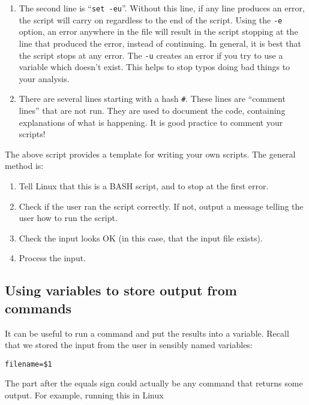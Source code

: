 \documentclass[11pt]{article}
\providecommand{\tightlist}{%
      \setlength{\itemsep}{0pt}\setlength{\parskip}{0pt}}
\begin{document}
\begin{enumerate}
\def\labelenumi{\arabic{enumi}.}
\tightlist
\item
  The second line is ``\texttt{set\ -eu}''. Without this line, if any
  line produces an error, the script will carry on regardless to the end
  of the script. Using the \texttt{-e} option, an error anywhere in the
  file will result in the script stopping at the line that produced the
  error, instead of continuing. In general, it is best that the script
  stops at any error. The \texttt{-u} creates an error if you try to use
  a variable which doesn't exist. This helps to stop typos doing bad
  things to your analysis.
\item
  There are several lines starting with a hash \texttt{\#}. These lines
  are ``comment lines'' that are not run. They are used to document the
  code, containing explanations of what is happening. It is good
  practice to comment your scripts!
\end{enumerate}

The above script provides a template for writing your own scripts. The
general method is:

\begin{enumerate}
\def\labelenumi{\arabic{enumi}.}
\tightlist
\item
  Tell Linux that this is a BASH script, and to stop at the first error.
\item
  Check if the user ran the script correctly. If not, output a message
  telling the user how to run the script.
\item
  Check the input looks OK (in this case, that the input file exists).
\item
  Process the input.
\end{enumerate}

\hypertarget{using-variables-to-store-output-from-commands}{%
\subsection{Using variables to store output from
commands}\label{using-variables-to-store-output-from-commands}}

It can be useful to run a command and put the results into a variable.
Recall that we stored the input from the user in sensibly named
variables:

\begin{verbatim}
filename=$1
\end{verbatim}

The part after the equals sign could actually be any command that
returns some output. For example, running this in Linux
\end{document}
